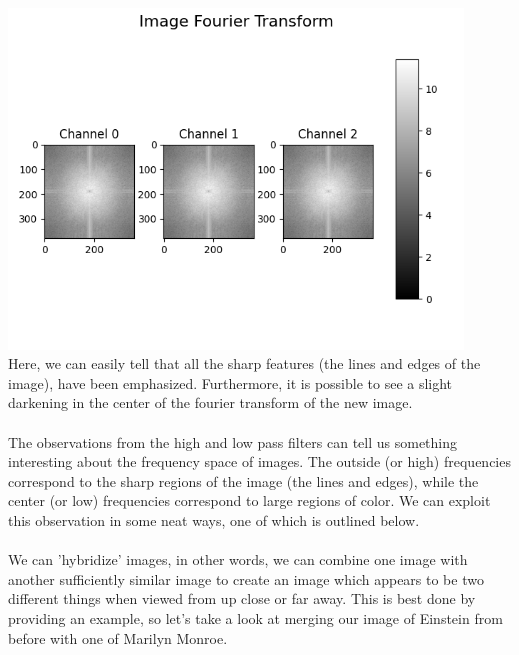 \documentclass[notitlepage]{article}
\begin{document}
\\
\includegraphics[width=4.75in]{../samples/images/einstein_high15_fourier_transform.png}
\\
Here, we can easily tell that all the sharp features (the lines and edges of the image),
have been emphasized. Furthermore, it is possible to see a slight darkening in the
center of the fourier transform of the new image.
\\\\
The observations from the high and low pass filters can tell us something interesting about
the frequency space of images. The outside (or high) frequencies correspond to the sharp
regions of the image (the lines and edges), while the center (or low) frequencies correspond
to large regions of color. We can exploit this observation in some neat ways, one of which is
outlined below.
\\\\
We can 'hybridize' images, in other words, we can combine one image with another sufficiently similar
image to create an image which appears to be two different things when viewed from up close or far away.
This is best done by providing an example, so let's take a look at merging our image of Einstein from
before with one of Marilyn Monroe.
\\
\end{document}
